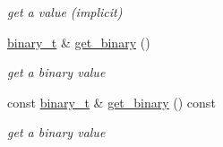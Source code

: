 \begin{DoxyCompactItemize}
\begin{DoxyCompactList}\small\item\em get a value (implicit) \end{DoxyCompactList}\item 
\hyperlink{classnlohmann_1_1basic__json_ad6c955145bebde84d93991ffed7cd389}{binary\+\_\+t} \& \hyperlink{classnlohmann_1_1basic__json_aab19a246f6bcd27c195bed376cf5e138}{get\+\_\+binary} ()
\begin{DoxyCompactList}\small\item\em get a binary value \end{DoxyCompactList}\item 
const \hyperlink{classnlohmann_1_1basic__json_ad6c955145bebde84d93991ffed7cd389}{binary\+\_\+t} \& \hyperlink{classnlohmann_1_1basic__json_abbfa5532931abd2d9040cbf4d18a2ca7}{get\+\_\+binary} () const
\begin{DoxyCompactList}\small\item\em get a binary value \end{DoxyCompactList}\end{DoxyCompactItemize}
